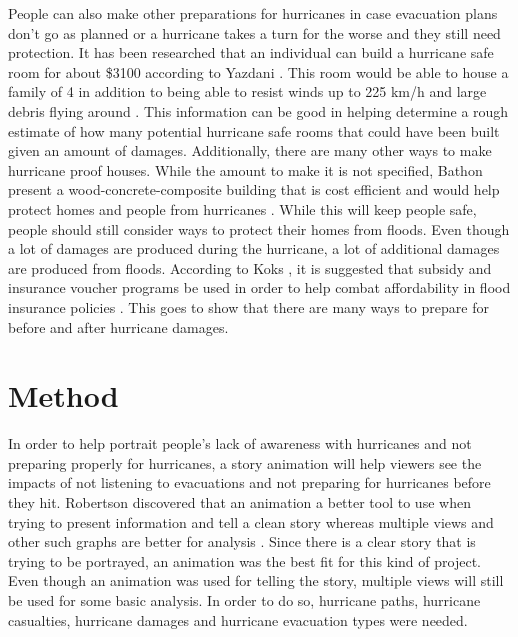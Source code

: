 People can also make other preparations for hurricanes in case evacuation plans don't go as planned or a hurricane takes a turn for the worse and they still need protection. It has been researched that an individual can build a hurricane safe room for about \$3100 according to Yazdani \etal. This room would be able to house a family of 4 in addition to being able to resist winds up to 225 km/h and large debris flying around \cite{yazdani2005hurricane}. This information can be good in helping determine  a rough estimate of how many potential hurricane safe rooms that could have been built given an amount of damages. Additionally, there are many other ways to make hurricane proof houses. While the amount to make it is not specified, Bathon \etal present a wood-concrete-composite building that is cost efficient and would help protect homes and people from hurricanes \cite{bathon2006hurricane}. While this will keep people safe, people should still consider ways to protect their homes from floods. Even though a lot of damages are produced during the hurricane, a lot of additional damages are produced from floods. According to Koks \etal, it is suggested that subsidy and insurance voucher programs be used in order to help combat affordability in flood insurance policies \cite{koks2015combining}. This goes to show that there are many ways to prepare for before and after hurricane damages.

\section{Method}

In order to help portrait people's lack of awareness with hurricanes and not preparing properly for hurricanes, a story animation will help viewers see the impacts of not listening to evacuations and not preparing for hurricanes before they hit. Robertson \etal discovered that an animation a better tool to use when trying to present information and tell a clean story whereas multiple views and other such graphs are better for analysis \cite{robertson2008effectiveness}. Since there is a clear story that is trying to be portrayed, an animation was the best fit for this kind of project. Even though an animation was used for telling the story, multiple views will still be used for some basic analysis. In order to do so, hurricane paths, hurricane casualties, hurricane damages and hurricane evacuation types were needed. 

